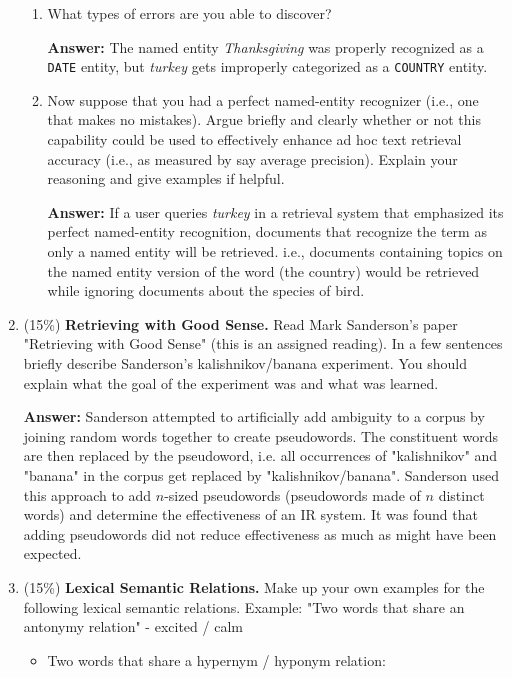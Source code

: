 \documentclass[11pt]{article}
\begin{document}
\begin{enumerate}
\begin{enumerate}
          \item What types of errors are you able to discover?

                \textbf{Answer:} The named entity \textit{Thanksgiving} was properly recognized as a \texttt{DATE} entity, but \textit{turkey} gets improperly categorized as a \texttt{COUNTRY} entity.

          \item Now suppose that you had a perfect named-entity recognizer (i.e., one that makes no mistakes). Argue briefly and clearly whether or not this capability could be used to effectively enhance ad hoc text retrieval accuracy (i.e., as measured by say average precision). Explain your reasoning and give examples if helpful.

                \textbf{Answer:} If a user queries \textit{turkey} in a retrieval system that emphasized its perfect named-entity recognition, documents that recognize the term as only a named entity will be retrieved. i.e., documents containing topics on the named entity version of the word (the country) would be retrieved while ignoring documents about the species of bird.

        \end{enumerate}

  \item (15\%) \textbf{Retrieving with Good Sense.} Read Mark Sanderson's paper "Retrieving with Good Sense" (this is an assigned reading). In a few sentences briefly describe Sanderson's kalishnikov/banana experiment. You should explain what the goal of the experiment was and what was learned.

        \textbf{Answer:} Sanderson attempted to artificially add ambiguity to a corpus by joining random words together to create pseudowords. The constituent words are then replaced by the pseudoword, i.e. all occurrences of "kalishnikov" and "banana" in the corpus get replaced by "kalishnikov/banana". Sanderson used this approach to add $n$-sized pseudowords (pseudowords made of $n$ distinct words) and determine the effectiveness of an IR system. It was found that adding pseudowords did not reduce effectiveness as much as might have been expected.

  \item (15\%) \textbf{Lexical Semantic Relations.} Make up your own examples for the following lexical semantic relations. Example: "Two words that share an antonymy relation" - excited / calm

        \begin{itemize}
          \item Two words that share a hypernym / hyponym relation:


\end{itemize}
\end{enumerate}
\end{document}
